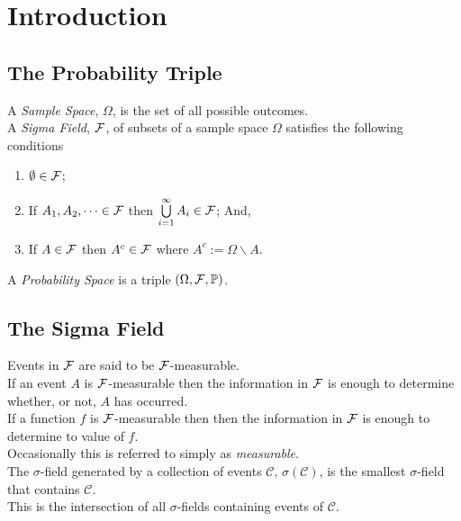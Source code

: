 \documentclass[11pt,a4paper]{article}
\begin{document}
\tableofcontents

\newpage

\section{Introduction}

\subsection{The Probability Triple}

A \textit{Sample Space}, $\Omega$, is the set of all possible outcomes.\\

A \textit{Sigma Field}, $\mathcal{F}$, of subsets of a sample space $\Omega$ satisfies the following conditions
\begin{enumerate}[label=\roman*)]
	\item $\emptyset\in\mathcal{F}$;
	\item If $A_1,A_2,\dots\in\mathcal{F}$ then $\bigcup\limits_{i=1}^\infty A_i\in\mathcal{F}$; And,
	\item If $A\in\mathcal{F}$ then $A^c\in\mathcal{F}$ where $A^c:=\Omega\backslash A$.
\end{enumerate}

A \textit{Probability Space} is a triple $(\Omega,\mathcal{F},\mathbb{P})$.

\subsection{The Sigma Field}

Events in $\mathcal{F}$ are said to be $\mathcal{F}$-measurable.\\
If an event $A$ is $\mathcal{F}$-measurable then the information in $\mathcal{F}$ is enough to determine whether, or not, $A$ has occurred.\\
If a function $f$ is $\mathcal{F}$-measurable then then the information in $\mathcal{F}$ is enough to determine to value of $f$.\\
\nb Occasionally this is referred to simply as \textit{measurable}.\\

The $\sigma$-field generated by a collection of events $\mathcal{C}$, $\sigma(\mathcal{C})$, is the smallest $\sigma$-field that contains $\mathcal{C}$.\\
\nb This is the intersection of all $\sigma$-fields containing events of $\mathcal{C}$.\\
\end{document}
